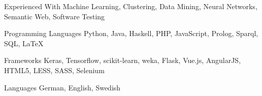 \begin{cvskills}
	\cvskill
	{Experienced With}
	{Machine Learning, Clustering, Data Mining, Neural Networks, Semantic Web, Software Testing}

	\cvskill
	{Programming Languages} %
	{Python, Java, Haskell, PHP, JavaScript, Prolog, Sparql, SQL, LaTeX} %

	\cvskill
	{Frameworks} %
	{Keras, Tensorflow, scikit-learn, weka, Flask, Vue.js, AngularJS, HTML5, LESS, SASS, Selenium} %

	\cvskill
	{Languages} %
	{German, English, Swedish} %

\end{cvskills}